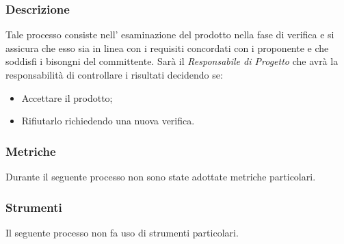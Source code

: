 \subsubsection{Descrizione}
Tale processo consiste nell' esaminazione del prodotto nella fase di verifica e si assicura che esso sia in linea con i requisiti concordati con i proponente e che soddisfi i bisongni del committente.
Sarà il \textit{Responsabile di Progetto} che avrà la responsabilità di controllare i risultati decidendo se:
\begin{itemize}
    \item Accettare il prodotto;
    \item Rifiutarlo richiedendo una nuova verifica.
\end{itemize}    
\subsubsection{Metriche}
Durante il seguente processo non sono state adottate metriche particolari.
\subsubsection{Strumenti}
Il seguente processo non fa uso di strumenti particolari.


